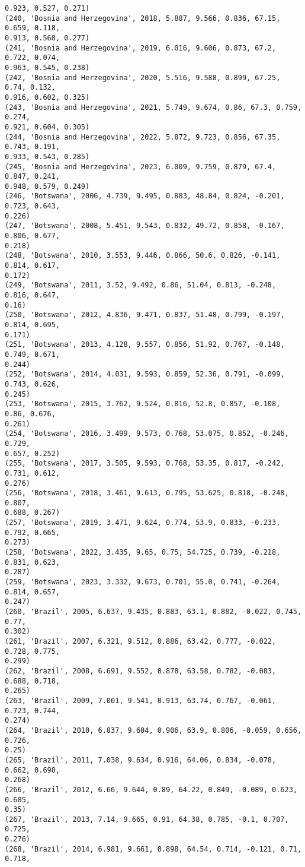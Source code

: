 \documentclass[11pt]{article}
\begin{document}
\begin{Verbatim}[commandchars=\\\{\}]
0.923, 0.527, 0.271)
(240, 'Bosnia and Herzegovina', 2018, 5.887, 9.566, 0.836, 67.15, 0.659, 0.118,
0.913, 0.568, 0.277)
(241, 'Bosnia and Herzegovina', 2019, 6.016, 9.606, 0.873, 67.2, 0.722, 0.074,
0.963, 0.545, 0.238)
(242, 'Bosnia and Herzegovina', 2020, 5.516, 9.588, 0.899, 67.25, 0.74, 0.132,
0.916, 0.602, 0.325)
(243, 'Bosnia and Herzegovina', 2021, 5.749, 9.674, 0.86, 67.3, 0.759, 0.274,
0.921, 0.604, 0.305)
(244, 'Bosnia and Herzegovina', 2022, 5.872, 9.723, 0.856, 67.35, 0.743, 0.191,
0.933, 0.543, 0.285)
(245, 'Bosnia and Herzegovina', 2023, 6.009, 9.759, 0.879, 67.4, 0.847, 0.241,
0.948, 0.579, 0.249)
(246, 'Botswana', 2006, 4.739, 9.495, 0.883, 48.84, 0.824, -0.201, 0.723, 0.643,
0.226)
(247, 'Botswana', 2008, 5.451, 9.543, 0.832, 49.72, 0.858, -0.167, 0.806, 0.677,
0.218)
(248, 'Botswana', 2010, 3.553, 9.446, 0.866, 50.6, 0.826, -0.141, 0.814, 0.617,
0.172)
(249, 'Botswana', 2011, 3.52, 9.492, 0.86, 51.04, 0.813, -0.248, 0.816, 0.647,
0.16)
(250, 'Botswana', 2012, 4.836, 9.471, 0.837, 51.48, 0.799, -0.197, 0.814, 0.695,
0.171)
(251, 'Botswana', 2013, 4.128, 9.557, 0.856, 51.92, 0.767, -0.148, 0.749, 0.671,
0.244)
(252, 'Botswana', 2014, 4.031, 9.593, 0.859, 52.36, 0.791, -0.099, 0.743, 0.626,
0.245)
(253, 'Botswana', 2015, 3.762, 9.524, 0.816, 52.8, 0.857, -0.108, 0.86, 0.676,
0.261)
(254, 'Botswana', 2016, 3.499, 9.573, 0.768, 53.075, 0.852, -0.246, 0.729,
0.657, 0.252)
(255, 'Botswana', 2017, 3.505, 9.593, 0.768, 53.35, 0.817, -0.242, 0.731, 0.612,
0.276)
(256, 'Botswana', 2018, 3.461, 9.613, 0.795, 53.625, 0.818, -0.248, 0.807,
0.688, 0.267)
(257, 'Botswana', 2019, 3.471, 9.624, 0.774, 53.9, 0.833, -0.233, 0.792, 0.665,
0.273)
(258, 'Botswana', 2022, 3.435, 9.65, 0.75, 54.725, 0.739, -0.218, 0.831, 0.623,
0.287)
(259, 'Botswana', 2023, 3.332, 9.673, 0.701, 55.0, 0.741, -0.264, 0.814, 0.657,
0.247)
(260, 'Brazil', 2005, 6.637, 9.435, 0.883, 63.1, 0.882, -0.022, 0.745, 0.77,
0.302)
(261, 'Brazil', 2007, 6.321, 9.512, 0.886, 63.42, 0.777, -0.022, 0.728, 0.775,
0.299)
(262, 'Brazil', 2008, 6.691, 9.552, 0.878, 63.58, 0.782, -0.083, 0.688, 0.718,
0.265)
(263, 'Brazil', 2009, 7.001, 9.541, 0.913, 63.74, 0.767, -0.061, 0.723, 0.744,
0.274)
(264, 'Brazil', 2010, 6.837, 9.604, 0.906, 63.9, 0.806, -0.059, 0.656, 0.726,
0.25)
(265, 'Brazil', 2011, 7.038, 9.634, 0.916, 64.06, 0.834, -0.078, 0.662, 0.698,
0.268)
(266, 'Brazil', 2012, 6.66, 9.644, 0.89, 64.22, 0.849, -0.089, 0.623, 0.685,
0.35)
(267, 'Brazil', 2013, 7.14, 9.665, 0.91, 64.38, 0.785, -0.1, 0.707, 0.725,
0.276)
(268, 'Brazil', 2014, 6.981, 9.661, 0.898, 64.54, 0.714, -0.121, 0.71, 0.718,

\end{Verbatim}
\end{document}
